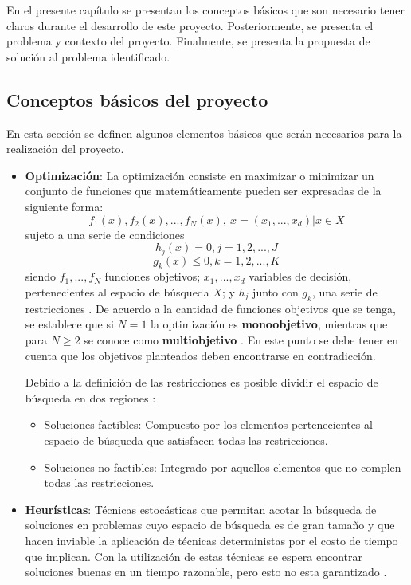 \documentclass[11pt,letterpaper]{article}
\begin{document}
En el presente capítulo se presentan los conceptos básicos que son necesario tener claros durante el desarrollo de este proyecto. Posteriormente, se presenta el problema y contexto del proyecto. Finalmente, se presenta la propuesta de solución al problema identificado.
\subsection{Conceptos básicos del proyecto} 

En esta sección se definen algunos elementos básicos que serán necesarios para la realización del proyecto.

\begin{itemize}
\item \textbf{Optimización}: La optimización consiste en maximizar o minimizar un conjunto de funciones que matemáticamente pueden ser expresadas de la siguiente forma:
$$f_1(x),f_2(x), ..., f_N(x),\ x=(x_1,...,x_d) | x \in X$$
sujeto a una serie de condiciones
$$h_j(x) = 0, j=1,2,...,J$$
$$g_k(x) \leq 0, k=1,2,...,K$$
siendo $f_1,...,f_N$ funciones objetivos; $x_1, ..., x_d$ variables de decisión, pertenecientes al espacio de búsqueda $X$; y $h_j$ junto con $g_k$, una serie de restricciones \cite{Yang2015}. De acuerdo a la cantidad de funciones objetivos que se tenga, se establece que si $N=1$ la optimización es \textbf{monoobjetivo}, mientras que para $N\geq 2$ se conoce como \textbf{multiobjetivo} \cite{Yang2015}. En este punto se debe tener en cuenta que los objetivos planteados deben encontrarse en contradicción. 

Debido a la definición de las restricciones es posible dividir el espacio de búsqueda en dos regiones \cite{Bozorg-Haddad2017}:
\begin{itemize}
	\item Soluciones factibles: Compuesto por los elementos pertenecientes al espacio de búsqueda que satisfacen todas las restricciones.
	\item Soluciones no factibles: Integrado por aquellos elementos que no complen todas las restricciones.
\end{itemize}

\item \textbf{Heurísticas}: Técnicas estocásticas que permitan acotar la búsqueda de soluciones en problemas cuyo espacio de búsqueda es de gran tamaño y que hacen inviable la aplicación de técnicas deterministas por el costo de tiempo que implican. Con la utilización de estas técnicas se espera encontrar soluciones buenas en un tiempo razonable, pero esto no esta garantizado \cite{Yang2015,Romanycia1985}.



\end{itemize}
\end{document}
